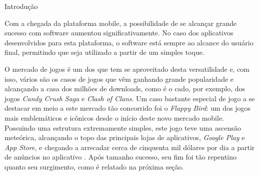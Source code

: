 Introdução

Com a chegada da plataforma mobile, a possibilidade de se alcançar grande sucesso com software aumentou significativamente. No caso dos aplicativos desenvolvidos para esta plataforma, o software está sempre ao alcance do usuário final, permitindo que seja utilizado a partir de um simples toque.

O mercado de jogos é um dos que tem se aproveitado desta versatilidade e, com isso, vários são os casos de jogos que vêm ganhando grande popularidade e alcançando a casa dos milhões de downloads, como é o cado, por exemplo, dos jogos \textit{Candy Crush Saga} e \textit{Clash of Clans}. Um caso bastante especial de jogo a se destacar em meio a este mercado tão concorrido foi o \textit{Flappy Bird}: um dos jogos mais emblemáticos e icônicos desde o início deste novo mercado mobile. Possuindo uma estrutura extremamente simples, este jogo teve uma ascensão meteórica, alcançando o topo das principais lojas de aplicativos, \textit{Google Play} e \textit{App Store}, e chegando a arrecadar cerca de cinquenta mil dólares por dia a partir de anúncios no aplicativo \cite{Warren2014}. Após tamanho sucesso, seu fim foi tão repentino quanto seu surgimento, como é relatado na próxima seção.




